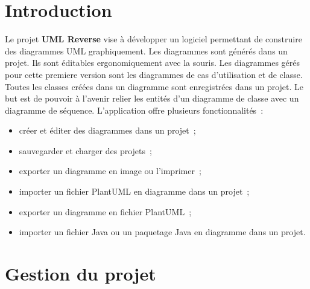 \documentclass[hidelinks, 10pt,a4paper]{article}
\begin{document}

\newpage
\tableofcontents
\newpage

\section{Introduction}
  Le projet \textbf{UML Reverse} vise à développer un logiciel permettant de construire des diagrammes UML graphiquement.
  Les diagrammes sont générés dans un projet. Ils sont éditables ergonomiquement avec la souris.
  Les diagrammes gérés pour cette premiere version sont les diagrammes de cas d'utilisation et de classe.
  Toutes les classes créées dans un diagramme sont enregistrées dans un projet. Le but est de pouvoir à l'avenir 
  relier les entités d'un diagramme de classe avec un diagramme de séquence.
  L'application offre plusieurs fonctionnalités~:
  \begin{itemize}
   \item créer et éditer des diagrammes dans un projet~;
   \item sauvegarder et charger des projets~;
   \item exporter un diagramme en image ou l'imprimer~;
   \item importer un fichier PlantUML en diagramme dans un projet~;
   \item exporter un diagramme en fichier PlantUML~;
   \item importer un fichier Java ou un paquetage Java en diagramme dans un projet.
  \end{itemize}
  
\section{Gestion du projet}
\end{document}
